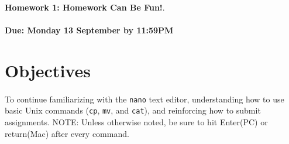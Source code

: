 \documentclass[letter,11pt]{article}
\begin{document}
\huge
\textbf{Homework 1: Homework Can Be Fun!}.
\normalsize
\\ ~~ \\
\textbf{Due: Monday 13 September by 11:59PM}

\section*{Objectives}
\paragraph{}To continue familiarizing with the \texttt{nano} text editor, understanding how to use basic Unix commands (\texttt{cp}, \texttt{mv}, and \texttt{cat}), and reinforcing how to submit assignments. NOTE: Unless otherwise noted, be sure to hit Enter(PC) or return(Mac) after every command.
\end{document}
